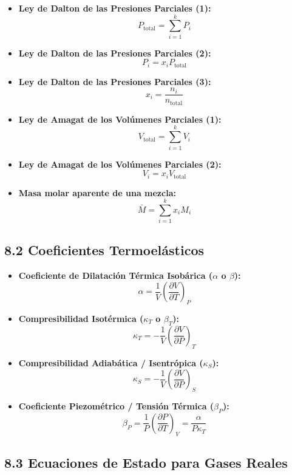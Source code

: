 \documentclass[11pt,a4paper]{article}
\begin{document}
\begin{itemize}
  \item \textbf{Ley de Dalton de las Presiones Parciales (1):}
  \[
    P_{\text{total}} = \sum_{i=1}^k P_i
  \]
  \item \textbf{Ley de Dalton de las Presiones Parciales (2):}
  \[
    P_i = x_i P_{\text{total}}
  \]
  \item \textbf{Ley de Dalton de las Presiones Parciales (3):}
  \[
    x_i = \frac{n_i}{n_{\text{total}}}
  \]
  \item \textbf{Ley de Amagat de los Volúmenes Parciales (1):}
  \[
    V_{\text{total}} = \sum_{i=1}^k V_i
  \]
  \item \textbf{Ley de Amagat de los Volúmenes Parciales (2):}
  \[
    V_i = x_i V_{\text{total}}
  \]
  \item \textbf{Masa molar aparente de una mezcla:}
  \[
    \bar{M} = \sum_{i=1}^k x_i M_i
  \]
\end{itemize}

\subsection*{8.2 Coeficientes Termoelásticos}

\begin{itemize}
  \item \textbf{Coeficiente de Dilatación Térmica Isobárica ($\alpha$ o $\beta$):}
  \[
    \alpha = \frac{1}{V} \left( \frac{\partial V}{\partial T} \right)_P
  \]
  \item \textbf{Compresibilidad Isotérmica ($\kappa_T$ o $\beta_T$):}
  \[
    \kappa_T = -\frac{1}{V} \left( \frac{\partial V}{\partial P} \right)_T
  \]
  \item \textbf{Compresibilidad Adiabática / Isentrópica ($\kappa_S$):}
  \[
    \kappa_S = -\frac{1}{V} \left( \frac{\partial V}{\partial P} \right)_S
  \]
  \item \textbf{Coeficiente Piezométrico / Tensión Térmica ($\beta_P$):}
  \[
    \beta_P = \frac{1}{P} \left( \frac{\partial P}{\partial T} \right)_V = \frac{\alpha}{P \kappa_T}
  \]
\end{itemize}

\subsection*{8.3 Ecuaciones de Estado para Gases Reales}
\end{document}
